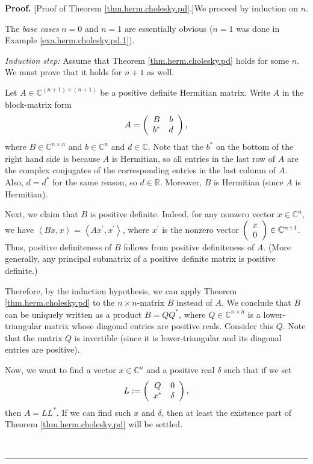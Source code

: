 \documentclass[numbers=enddot,12pt,final,onecolumn,notitlepage]{scrartcl}%
\numberwithin{exer}{subsection}
\theoremstyle{definition}
\newenvironment{proof}[1][Proof]{\noindent\textbf{#1.} }{\ \rule{0.5em}{0.5em}}
\begin{document}
\begin{proof}
[Proof of Theorem \ref{thm.herm.cholesky.pd}.]We proceed by induction on $n$.

The \textit{base cases} $n=0$ and $n=1$ are essentially obvious ($n=1$ was
done in Example \ref{exa.herm.cholesky.pd.1}).

\textit{Induction step:} Assume that Theorem \ref{thm.herm.cholesky.pd} holds
for some $n$. We must prove that it holds for $n+1$ as well.

Let $A\in\mathbb{C}^{\left(  n+1\right)  \times\left(  n+1\right)  }$ be a
positive definite Hermitian matrix. Write $A$ in the block-matrix form%
\[
A=\left(
\begin{array}
[c]{cc}%
B & b\\
b^{\ast} & d
\end{array}
\right)  ,
\]
where $B\in\mathbb{C}^{n\times n}$ and $b\in\mathbb{C}^{n}$ and $d\in
\mathbb{C}$. Note that the $b^{\ast}$ on the bottom of the right hand side is
because $A$ is Hermitian, so all entries in the last row of $A$ are the
complex conjugates of the corresponding entries in the last column of $A$.
Also, $d=d^{\ast}$ for the same reason, so $d\in\mathbb{R}$. Moreover, $B$ is
Hermitian (since $A$ is Hermitian).

Next, we claim that $B$ is positive definite. Indeed, for any nonzero vector
$x\in\mathbb{C}^{n}$, we have $\left\langle Bx,x\right\rangle =\left\langle
Ax^{\prime},x^{\prime}\right\rangle $, where $x^{\prime}$ is the nonzero
vector $\left(
\begin{array}
[c]{c}%
x\\
0
\end{array}
\right)  \in\mathbb{C}^{n+1}$. Thus, positive definiteness of $B$ follows from
positive definiteness of $A$. (More generally, any principal submatrix of a
positive definite matrix is positive definite.)

Therefore, by the induction hypothesis, we can apply Theorem
\ref{thm.herm.cholesky.pd} to the $n\times n$-matrix $B$ instead of $A$. We
conclude that $B$ can be uniquely written as a product $B=QQ^{\ast}$, where
$Q\in\mathbb{C}^{n\times n}$ is a lower-triangular matrix whose diagonal
entries are positive reals. Consider this $Q$. Note that the matrix $Q$ is
invertible (since it is lower-triangular and its diagonal entries are positive).

Now, we want to find a vector $x\in\mathbb{C}^{n}$ and a positive real
$\delta$ such that if we set%
\[
L:=\left(
\begin{array}
[c]{cc}%
Q & 0\\
x^{\ast} & \delta
\end{array}
\right)  ,
\]
then $A=LL^{\ast}$. If we can find such $x$ and $\delta$, then at least the
existence part of Theorem \ref{thm.herm.cholesky.pd} will be settled.


\end{proof}
\end{document}
